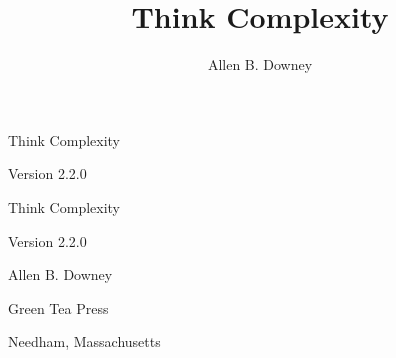 \documentclass[12pt]{book}
\title{Think Complexity}
\author{Allen B. Downey}
\newcommand{\thetitle}{Think Complexity}
\newcommand{\theauthors}{Allen B. Downey}
\newcommand{\theversion}{2.2.0}
\theoremstyle{exercise}
\newcommand\blankpage{%
    \null
    \thispagestyle{empty}%
    \addtocounter{page}{-1}%
    \newpage}
\newif\ifplastex
\begin{document}
\frontmatter

\ifplastex

\maketitle

\else

\begin{latexonly}

\thispagestyle{empty}

\begin{flushright}
\vspace*{2.0in}

\begin{spacing}{3}
{\huge \thetitle}
\end{spacing}

\vspace{0.25in}

Version \theversion

\vfill

\end{flushright}


\afterpage{\blankpage}


\pagebreak
\thispagestyle{empty}

\begin{flushright}
\vspace*{2.0in}

\begin{spacing}{3}
{\huge \thetitle}
\end{spacing}

\vspace{0.25in}

Version \theversion

\vspace{1in}


{\Large
\theauthors \\
}


\vspace{0.5in}

{\Large Green Tea Press}

{\small Needham, Massachusetts}


\end{flushright}
\end{latexonly}
\end{document}
